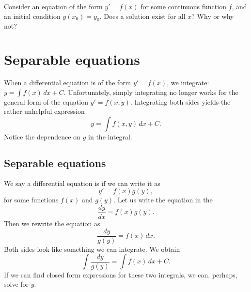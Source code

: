 \begin{exercise}
Consider an equation of the form $y' = f(x)$ for some continuous function
$f$, and an initial condition $y(x_0) = y_0$.  Does a
solution exist for all $x$?  Why or why not?
\end{exercise}


\sectionnewpage
\section{Separable equations}
\label{separable:section}



When a differential equation is of the form
$y' = f(x)$,
we integrate:
$y = \int f(x) \,dx + C$. 
Unfortunately, simply integrating no longer works for the
general form of the equation
$y' = f(x,y)$.
Integrating both sides yields the rather unhelpful expression
\begin{equation*}
y = \int f(x,y) \,dx + C .
\end{equation*}
Notice the dependence on $y$ in the integral.

\subsection{Separable equations}

We say a differential equation is
\emph{}
if we can write it as
\begin{equation*}
y' = f(x)g(y) ,
\end{equation*}
for some functions $f(x)$ and $g(y)$.
Let us write the equation in the 
\begin{equation*}
\frac{dy}{dx} = f(x)g(y) .
\end{equation*}
Then we rewrite the equation as
\begin{equation*}
\frac{dy}{g(y)} = f(x) \,dx .
\end{equation*}
Both sides look like something we can integrate.  We obtain
\begin{equation*}
\int \frac{dy}{g(y)} = \int f(x) \,dx + C .
\end{equation*}
If we can find closed form expressions
for these two integrals, we can, perhaps, solve for $y$.

